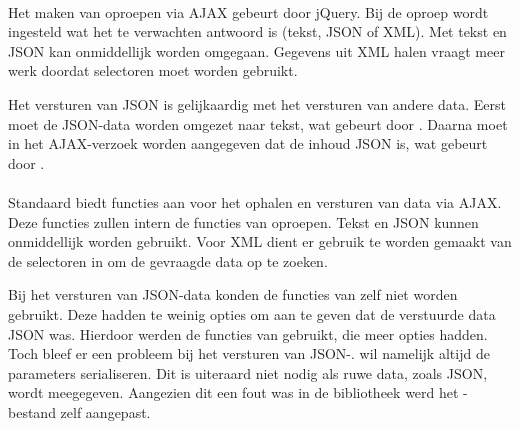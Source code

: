 \paragraph{\jqm}
Het maken van oproepen via AJAX gebeurt door jQuery. 
Bij de oproep wordt ingesteld wat het te verwachten antwoord is (tekst, JSON of XML). 
Met tekst en JSON kan onmiddellijk worden omgegaan.
Gegevens uit XML halen vraagt meer werk doordat selectoren moet worden gebruikt.



Het versturen van JSON is gelijkaardig met het versturen van andere data.
Eerst moet de JSON-data worden omgezet naar tekst, wat gebeurt door .
Daarna moet in het AJAX-verzoek worden aangegeven dat de inhoud JSON is, wat gebeurt door .

\paragraph{\lungo}
Standaard biedt \lungo{} functies aan voor het ophalen en versturen van data via AJAX.
Deze functies zullen intern de functies van \quo{} oproepen.
Tekst en JSON kunnen onmiddellijk worden gebruikt.
Voor XML dient er gebruik te worden gemaakt van de selectoren in \quo{} om de gevraagde data op te zoeken.

Bij het versturen van JSON-data konden de functies van \lungo{} zelf niet worden gebruikt.
Deze hadden te weinig opties om aan te geven dat de verstuurde data JSON was.
Hierdoor werden de functies van \quo{} gebruikt, die meer opties hadden.
Toch bleef er een probleem bij het versturen van JSON-.
\quo{} wil namelijk altijd de parameters serialiseren.
Dit is uiteraard niet nodig als ruwe data, zoals JSON, wordt meegegeven.
Aangezien dit een fout was in de bibliotheek werd het \js-bestand zelf aangepast.

